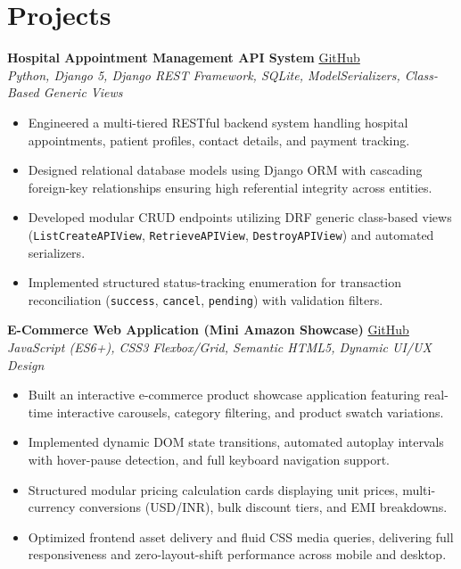 \documentclass[a4paper,9pt]{extarticle}
\begin{document}
\section{Projects}

\noindent\textbf{Hospital Appointment Management API System} \hfill \href{https://github.com/krabhishek9/Hospital_Appointment-API}{GitHub}\\
\textit{Python, Django 5, Django REST Framework, SQLite, ModelSerializers, Class-Based Generic Views}
\begin{itemize}
    \item Engineered a multi-tiered RESTful backend system handling hospital appointments, patient profiles, contact details, and payment tracking.
    \item Designed relational database models using Django ORM with cascading foreign-key relationships ensuring high referential integrity across entities.
    \item Developed modular CRUD endpoints utilizing DRF generic class-based views (\texttt{ListCreateAPIView}, \texttt{RetrieveAPIView}, \texttt{DestroyAPIView}) and automated serializers.
    \item Implemented structured status-tracking enumeration for transaction reconciliation (\texttt{success}, \texttt{cancel}, \texttt{pending}) with validation filters.
\end{itemize}

\vspace{5pt}
\noindent\textbf{E-Commerce Web Application (Mini Amazon Showcase)} \hfill \href{https://github.com/krabhishek9/MIni-Amazon-clone}{GitHub}\\
\textit{JavaScript (ES6+), CSS3 Flexbox/Grid, Semantic HTML5, Dynamic UI/UX Design}
\begin{itemize}
    \item Built an interactive e-commerce product showcase application featuring real-time interactive carousels, category filtering, and product swatch variations.
    \item Implemented dynamic DOM state transitions, automated autoplay intervals with hover-pause detection, and full keyboard navigation support.
    \item Structured modular pricing calculation cards displaying unit prices, multi-currency conversions (USD/INR), bulk discount tiers, and EMI breakdowns.
    \item Optimized frontend asset delivery and fluid CSS media queries, delivering full responsiveness and zero-layout-shift performance across mobile and desktop.
\end{itemize}
\end{document}
